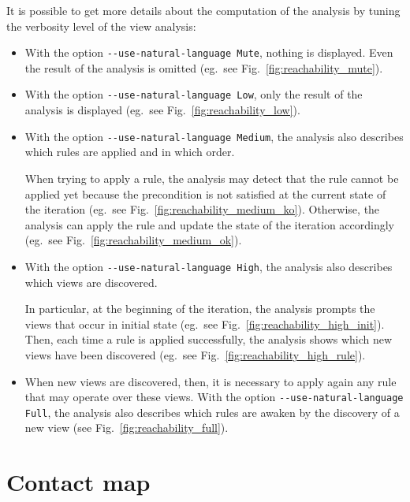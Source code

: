 \documentclass[11pt]{book}
\begin{document}
It is possible to get more details about the computation of the analysis by tuning the verbosity level of the view analysis:
\begin{itemize}
\item With the option \verb?--use-natural-language Mute?, nothing is displayed. Even the result of the analysis is omitted (eg.~see Fig.~\ref{fig:reachability_mute}).




\item With the option \verb?--use-natural-language Low?, only the result of the analysis is displayed (eg.~see Fig.~\ref{fig:reachability_low}). 



\item With the option \verb?--use-natural-language Medium?, the analysis also describes which rules are applied and in which order. 

When trying to apply a rule, the analysis may detect that the rule cannot be applied yet because the precondition is not satisfied at the current state of the iteration (eg.~see Fig.~\ref{fig:reachability_medium_ko}). Otherwise, the analysis can apply the rule and update the state of the iteration accordingly (eg.~see Fig.~\ref{fig:reachability_medium_ok}).



\item With the option \verb?--use-natural-language High?, the analysis also describes which views are discovered.

In particular, at the beginning of the iteration, the analysis prompts the views that occur in initial state (eg.~see Fig.~\ref{fig:reachability_high_init}). Then, each time a rule is applied successfully, the analysis shows which new views have been discovered (eg.~see Fig.~\ref{fig:reachability_high_rule}).



\item When new views are discovered, then, it is necessary to apply again any rule that may operate over these views. With the option \verb?--use-natural-language Full?, the analysis also describes which rules are awaken by the discovery of a new view (see Fig.~\ref{fig:reachability_full}). 



\end{itemize}



\section{Contact map}
\end{document}
